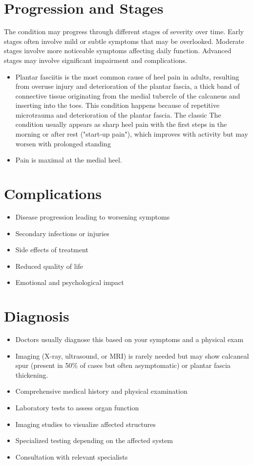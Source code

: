 \section{Progression and Stages}
The condition may progress through different stages of severity over time. Early stages often involve mild or subtle symptoms that may be overlooked. Moderate stages involve more noticeable symptoms affecting daily function. Advanced stages may involve significant impairment and complications.

\begin{itemize}[noitemsep]
  \item Plantar fasciitis is the most common cause of heel pain in adults, resulting from overuse injury and deterioration of the plantar fascia, a thick band of connective tissue originating from the medial tubercle of the calcaneus and inserting into the toes. This condition happens because of repetitive microtrauma and deterioration of the plantar fascia. The classic The condition usually appears as sharp heel pain with the first steps in the morning or after rest ("start-up pain"), which improves with activity but may worsen with prolonged standing
  \item Pain is maximal at the medial heel.
\end{itemize}
\section{Complications}
\begin{itemize}[noitemsep]
  \item Disease progression leading to worsening symptoms
  \item Secondary infections or injuries
  \item Side effects of treatment
  \item Reduced quality of life
  \item Emotional and psychological impact
\end{itemize}
\section{Diagnosis}
\begin{itemize}[noitemsep]
  \item Doctors usually diagnose this based on your symptoms and a physical exam
  \item Imaging (X-ray, ultrasound, or MRI) is rarely needed but may show calcaneal spur (present in 50\% of cases but often asymptomatic) or plantar fascia thickening.
  \item Comprehensive medical history and physical examination
  \item Laboratory tests to assess organ function
  \item Imaging studies to visualize affected structures
  \item Specialized testing depending on the affected system
  \item Consultation with relevant specialists
\end{itemize}
